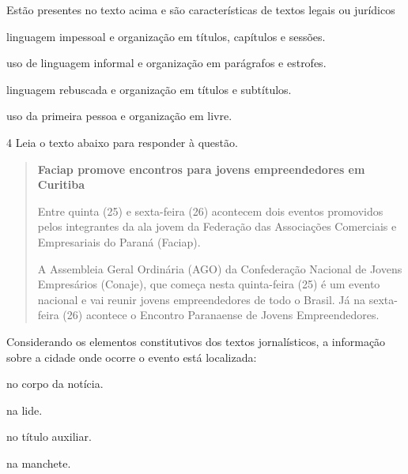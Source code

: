
Estão presentes no texto acima e são características de textos legais ou
jurídicos

\begin{escolha}

\item linguagem impessoal e organização em títulos, capítulos e sessões.
\item uso de linguagem informal e organização em parágrafos e estrofes.
\item linguagem rebuscada e organização em títulos e subtítulos.
\item uso da primeira pessoa e organização em livre.
\end{escolha}

\num{4} Leia o texto abaixo para responder à questão. 

\begin{quote}

\textbf{Faciap promove encontros para jovens empreendedores em Curitiba}

Entre quinta (25) e sexta-feira (26) acontecem dois eventos promovidos
pelos integrantes da ala jovem da Federação das Associações Comerciais e
Empresariais do Paraná (Faciap).

A Assembleia Geral Ordinária (AGO) da Confederação Nacional de Jovens
Empresários (Conaje), que começa nesta quinta-feira (25) é um evento
nacional e vai reunir jovens empreendedores de todo o Brasil. Já na
sexta-feira (26) acontece o Encontro Paranaense de Jovens
Empreendedores.

\end{quote}


Considerando os elementos constitutivos dos textos jornalísticos, a
informação sobre a cidade onde ocorre o evento está localizada:

\begin{multicols}{2}
\begin{escolha}
  
  \item no corpo da notícia.
  
  \item na lide.
  
  \item no título auxiliar.
  
  \item na manchete.

\end{escolha}
\end{multicols}

